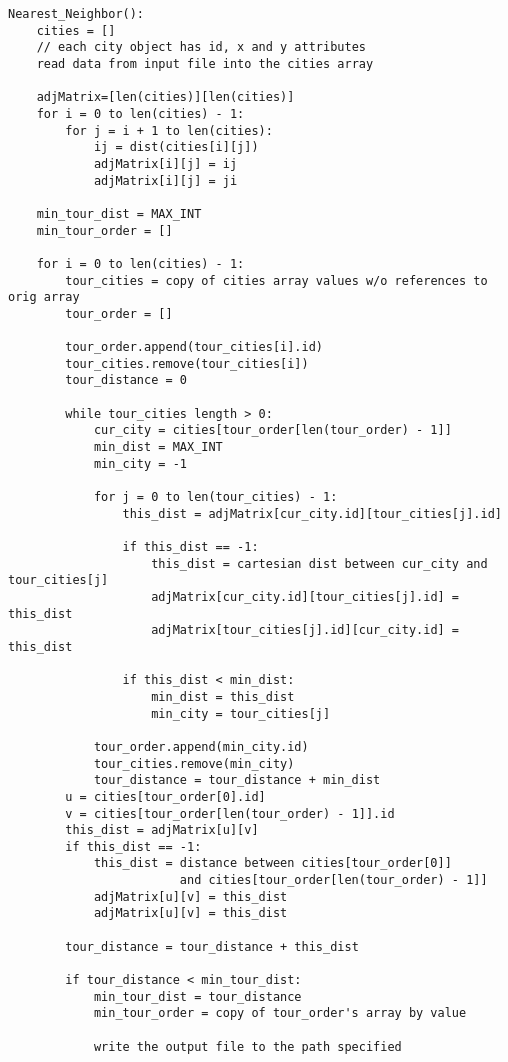 \documentclass[../report/main.tex]{subfiles}
\begin{document}
\begin{verbatim}
Nearest_Neighbor():
    cities = []
    // each city object has id, x and y attributes
    read data from input file into the cities array  

    adjMatrix=[len(cities)][len(cities)]
    for i = 0 to len(cities) - 1:
        for j = i + 1 to len(cities):
            ij = dist(cities[i][j])
            adjMatrix[i][j] = ij
            adjMatrix[i][j] = ji

    min_tour_dist = MAX_INT
    min_tour_order = []

    for i = 0 to len(cities) - 1:
        tour_cities = copy of cities array values w/o references to orig array
        tour_order = []

        tour_order.append(tour_cities[i].id)
        tour_cities.remove(tour_cities[i])
        tour_distance = 0

        while tour_cities length > 0:
            cur_city = cities[tour_order[len(tour_order) - 1]]
            min_dist = MAX_INT
            min_city = -1

            for j = 0 to len(tour_cities) - 1:
                this_dist = adjMatrix[cur_city.id][tour_cities[j].id]

                if this_dist == -1:
                    this_dist = cartesian dist between cur_city and tour_cities[j]
                    adjMatrix[cur_city.id][tour_cities[j].id] = this_dist
                    adjMatrix[tour_cities[j].id][cur_city.id] = this_dist

                if this_dist < min_dist:
                    min_dist = this_dist
                    min_city = tour_cities[j]

            tour_order.append(min_city.id)
            tour_cities.remove(min_city)
            tour_distance = tour_distance + min_dist
        u = cities[tour_order[0].id]
        v = cities[tour_order[len(tour_order) - 1]].id
        this_dist = adjMatrix[u][v]
        if this_dist == -1:
            this_dist = distance between cities[tour_order[0]] 
                        and cities[tour_order[len(tour_order) - 1]]
            adjMatrix[u][v] = this_dist
            adjMatrix[u][v] = this_dist

        tour_distance = tour_distance + this_dist

        if tour_distance < min_tour_dist:
            min_tour_dist = tour_distance
            min_tour_order = copy of tour_order's array by value 

            write the output file to the path specified
\end{verbatim}
\end{document}
